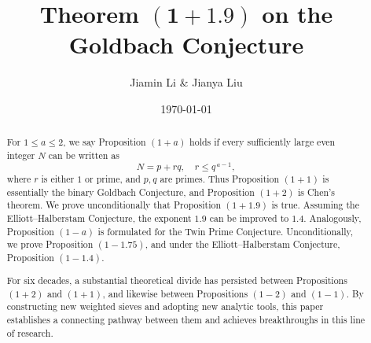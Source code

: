 \documentclass[12pt, a4paper]{amsart}
\def\leq{\leqslant}
\theoremstyle{plain}
\theoremstyle{remark}
\numberwithin{equation}{section}
\begin{document}
	
\title[Theorem $(1+1.9)$ on the Goldbach Conjecture]  
{Theorem $\mathbf{(1+1.9)}$ on the Goldbach Conjecture} 
	
\author{Jiamin Li \& Jianya Liu}
	
\address{%
Jiamin Li
		\\
Mathematical Research Center
		\\
Shandong University
		\\
Jinan, Shandong 250100
		\\
P. R. China
	}
\address{%
Jianya Liu
		\\
State Key Laboratory of Cryptography and Digital Economy Security \& Mathematical Research Center
		\\
Shandong University
		\\
Jinan, Shandong 250100
		\\
P. R. China
}
	
\date{\today}
	
\begin{abstract} 
For \( 1 \leq a \leq 2 \), we say Proposition \((1+a)\) holds if every sufficiently large even 
integer \(N\) can be written as  
\[
N = p + rq, \quad r \leq q^{\,a-1},
\]
where \(r\) is either \(1\) or prime, and \(p,q\) are primes.  
Thus Proposition $(1+1)$ is essentially the binary Goldbach Conjecture, and 
Proposition \((1+2)\) is Chen's theorem. 
We prove unconditionally that Proposition \((1+1.9)\) is true. 
Assuming the Elliott--Halberstam Conjecture, the exponent \(1.9\) can be improved to \(1.4\).  
Analogously, Proposition \((1-a)\) is formulated for the Twin Prime Conjecture. 
Unconditionally, we prove Proposition \((1-1.75)\), and under the Elliott--Halberstam Conjecture, Proposition \((1-1.4)\).   

For six decades, a substantial theoretical divide has persisted between Propositions $(1+2)$ and $(1+1)$, 
and likewise between Propositions $(1-2)$ and $(1-1)$. By constructing new weighted sieves and adopting new 
analytic tools, this paper establishes a connecting pathway between them and achieves 
breakthroughs in this line of research. 
\end{abstract}
	
	
\maketitle
	
\end{document}
